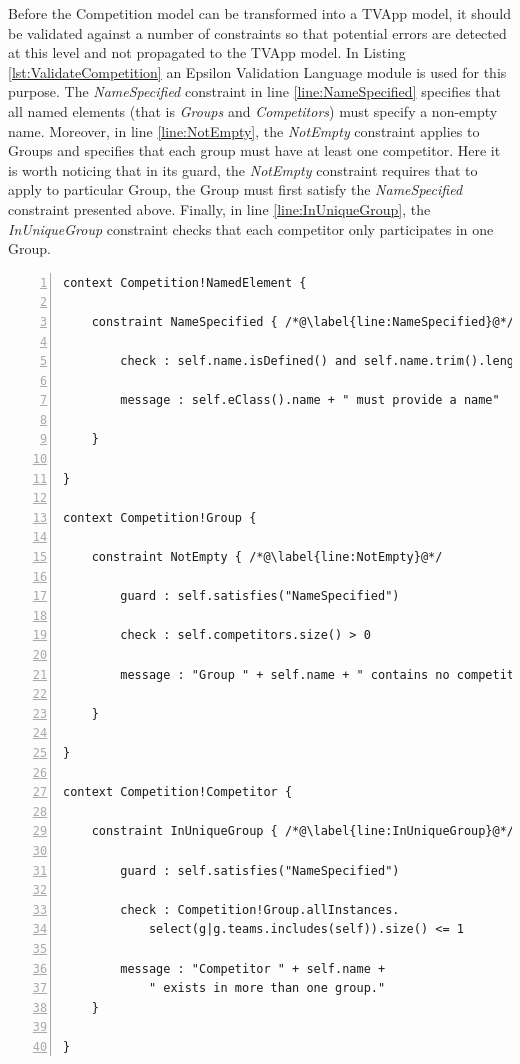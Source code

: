 Before the Competition model can be transformed into a TVApp model, it should be validated against a number of constraints so that potential errors are detected at this level and not propagated to the TVApp model. In Listing \ref{lst:ValidateCompetition} an Epsilon Validation Language module is used for this purpose. The \emph{NameSpecified} constraint in line \ref{line:NameSpecified} specifies that all named elements (that is \emph{Groups} and \emph{Competitors}) must specify a non-empty name. Moreover, in line \ref{line:NotEmpty}, the \emph{NotEmpty} constraint applies to Groups and specifies that each group must have at least one competitor. Here it is worth noticing that in its guard, the \emph{NotEmpty} constraint requires that to apply to particular Group, the Group must first satisfy the \emph{NameSpecified} constraint presented above. Finally, in line \ref{line:InUniqueGroup}, the \emph{InUniqueGroup} constraint checks that each competitor only participates in one Group.

\begin{lstlisting}[basicstyle=\ttfamily\footnotesize, flexiblecolumns=true, numbers=left, nolol=true, caption=EVL module that validates a Competition model, label=lst:ValidateCompetition, language=EVL, tabsize=2]
context Competition!NamedElement {
	
	constraint NameSpecified { /*@\label{line:NameSpecified}@*/
		
		check : self.name.isDefined() and self.name.trim().length > 0
		
		message : self.eClass().name + " must provide a name"
		
	}
	
}

context Competition!Group {
	
	constraint NotEmpty { /*@\label{line:NotEmpty}@*/
		
		guard : self.satisfies("NameSpecified")
		
		check : self.competitors.size() > 0
		
		message : "Group " + self.name + " contains no competitors"
		
	}
	
}

context Competition!Competitor {
	
	constraint InUniqueGroup { /*@\label{line:InUniqueGroup}@*/
		
		guard : self.satisfies("NameSpecified")
		
		check : Competition!Group.allInstances.
			select(g|g.teams.includes(self)).size() <= 1
		
		message : "Competitor " + self.name + 
			" exists in more than one group."
	}
	
}
\end{lstlisting}


